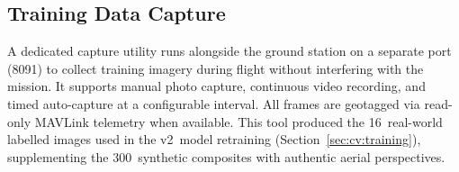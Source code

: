 \subsection{Training Data Capture}\label{sec:gs-training}

A dedicated capture utility runs alongside the ground station on a separate port (8091) to collect training imagery during flight without interfering with the mission. It supports manual photo capture, continuous video recording, and timed auto-capture at a configurable interval. All frames are geotagged via read-only MAVLink telemetry when available. This tool produced the 16~real-world labelled images used in the v2~model retraining (Section~\ref{sec:cv:training}), supplementing the 300~synthetic composites with authentic aerial perspectives.
